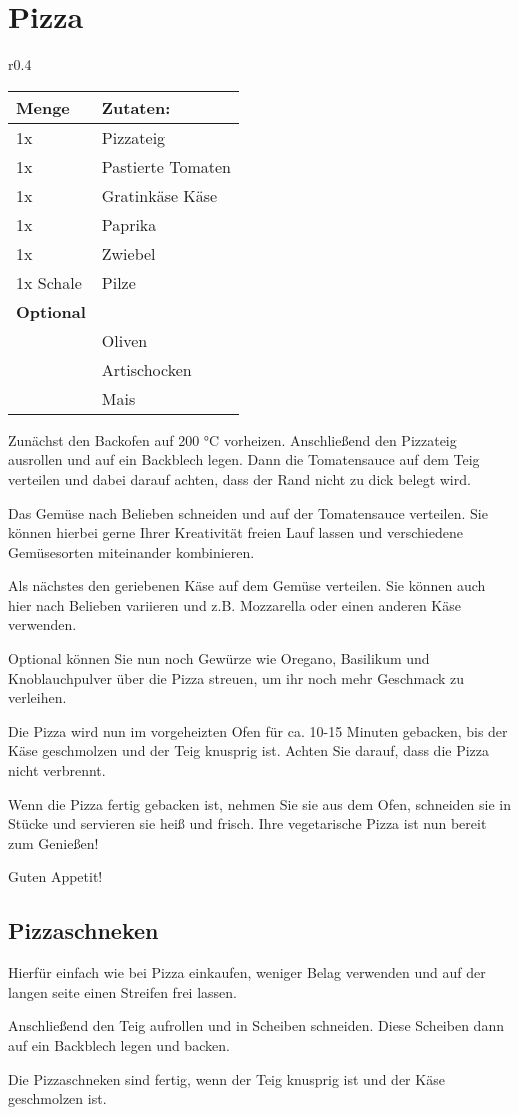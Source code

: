 \documentclass[../../book.tex]{subfiles}
\begin{document}
\section{Pizza}
\begin{wraptable}{r}{0.4\textwidth}
    \centering
    \begin{tabularx}{0.39\textwidth}{|l|X|}
        \hline
        Menge & Zutaten: \\
        \hline
        1x & Pizzateig \\
        \hline
        1x & Pastierte Tomaten \\
        \hline
        1x & Gratinkäse Käse\\
        \hline
        1x & Paprika\\
        \hline
        1x & Zwiebel\\
        \hline
        1x Schale & Pilze\\
        \hline
        \textbf{Optional} & \\
        \hline
        & Oliven\\
        \hline
        & Artischocken\\
        \hline
        & Mais\\
        \hline
    \end{tabularx}
\end{wraptable}
Zunächst den Backofen auf 200 °C vorheizen. Anschließend den Pizzateig ausrollen und auf ein Backblech legen. Dann die Tomatensauce auf dem Teig verteilen und dabei darauf achten, dass der Rand nicht zu dick belegt wird.

Das Gemüse nach Belieben schneiden und auf der Tomatensauce verteilen. Sie können hierbei gerne Ihrer Kreativität freien Lauf lassen und verschiedene Gemüsesorten miteinander kombinieren.

Als nächstes den geriebenen Käse auf dem Gemüse verteilen. Sie können auch hier nach Belieben variieren und z.B. Mozzarella oder einen anderen Käse verwenden.

Optional können Sie nun noch Gewürze wie Oregano, Basilikum und Knoblauchpulver über die Pizza streuen, um ihr noch mehr Geschmack zu verleihen.

Die Pizza wird nun im vorgeheizten Ofen für ca. 10-15 Minuten gebacken, bis der Käse geschmolzen und der Teig knusprig ist. Achten Sie darauf, dass die Pizza nicht verbrennt.

Wenn die Pizza fertig gebacken ist, nehmen Sie sie aus dem Ofen, schneiden sie in Stücke und servieren sie heiß und frisch. Ihre vegetarische Pizza ist nun bereit zum Genießen!

Guten Appetit!
\subsection{Pizzaschneken}

Hierfür einfach wie bei Pizza einkaufen, weniger Belag verwenden und auf der langen seite einen Streifen frei lassen.

Anschließend den Teig aufrollen und in Scheiben schneiden. Diese Scheiben dann auf ein Backblech legen und backen.

Die Pizzaschneken sind fertig, wenn der Teig knusprig ist und der Käse geschmolzen ist.

\newpage
\end{document}

